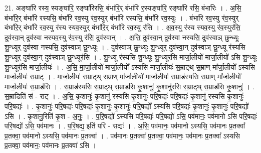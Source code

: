 \documentclass[17pt]{extarticle}
\begin{document}
21. अङ्घा॑रि रस्य॒ स्यङ्घा॑रि॒ रङ्घा॑रिरसि॒ बंभा॑रि॒र् बंभा॑रि र॒स्यङ्घा॑रि॒ रङ्घा॑रि रसि॒ बंभा॑रिः । . अ॒सि॒ बंभा॑रि॒र् बंभा॑रि रस्यसि॒ बंभा॑रि रव॒स्यु र॑व॒स्युर् बंभा॑रि रस्यसि॒ बंभा॑रि रव॒स्युः । . बंभा॑रि रव॒स्यु र॑व॒स्युर् बंभा॑रि॒र् बंभा॑रि रव॒स्यु र॑स्य स्यव॒स्युर् बंभा॑रि॒र् बंभा॑रि रव॒स्यु र॑सि । . अ॒व॒स्यु र॑स्य स्यव॒स्यु र॑व॒स्युर॑सि॒ दुव॑स्वा॒न् दुव॑स्वा नस्यव॒स्यु र॑व॒स्यु र॑सि॒ दुव॑स्वान् । . अ॒सि॒ दुव॑स्वा॒न् दुव॑स्वा नस्यसि॒ दुव॑स्वाञ् छु॒न्ध्यूः शु॒न्ध्यूर् दुव॑स्वा नस्यसि॒ दुव॑स्वाञ् छु॒न्ध्यूः । . दुव॑स्वाञ् छु॒न्ध्यूः शु॒न्ध्यूर् दुव॑स्वा॒न् दुव॑स्वाञ् छु॒न्ध्यू र॑स्यसि शु॒न्ध्यूर् दुव॑स्वा॒न् दुव॑स्वाञ् छु॒न्ध्यूर॑सि । . शु॒न्ध्यू र॑स्यसि शु॒न्ध्यूः शु॒न्ध्यूर॑सि मार्जा॒लीयो॑ मार्जा॒लीयो॑ ऽसि शु॒न्ध्यूः शु॒न्ध्यूर॑सि मार्जा॒लीयः॑ । . अ॒सि॒ मा॒र्जा॒लीयो॑ मार्जा॒लीयो᳚ ऽस्यसि मार्जा॒लीयः॑ स॒म्राट्थ् स॒म्राण् मा᳚र्जा॒लीयो᳚ ऽस्यसि मार्जा॒लीयः॑ स॒म्राट् । . मा॒र्जा॒लीयः॑ स॒म्राट्थ् स॒म्राण् मा᳚र्जा॒लीयो॑ मार्जा॒लीयः॑ स॒म्राड॑स्यसि स॒म्राण् मा᳚र्जा॒लीयो॑ मार्जा॒लीयः॑ स॒म्राड॑सि । . स॒म्राड॑स्यसि स॒म्राट्थ् स॒म्राड॑सि कृ॒शानुः॑ कृ॒शानु॑रसि स॒म्राट्थ् स॒म्राड॑सि कृ॒शानुः॑ । . स॒म्राडिति॑ सं - राट् । . अ॒सि॒ कृ॒शानुः॑ कृ॒शानु॑ रस्यसि कृ॒शानुः॑ परि॒षद्यः॑ परि॒षद्यः॑ कृ॒शानु॑ रस्यसि कृ॒शानुः॑ परि॒षद्यः॑ । . कृ॒शानुः॑ परि॒षद्यः॑ परि॒षद्यः॑ कृ॒शानुः॑ कृ॒शानुः॑ परि॒षद्यो᳚ ऽस्यसि परि॒षद्यः॑ कृ॒शानुः॑ कृ॒शानुः॑ परि॒षद्यो॑ ऽसि । . कृ॒शानु॒रिति॑ कृ॒श - अ॒नुः॒ । . प॒रि॒षद्यो᳚ ऽस्यसि परि॒षद्यः॑ परि॒षद्यो॑ ऽसि॒ पव॑मानः॒ पव॑मानो ऽसि परि॒षद्यः॑ परि॒षद्यो॑ ऽसि॒ पव॑मानः । . प॒रि॒षद्य॒ इति॑ परि - सद्यः॑ । . अ॒सि॒ पव॑मानः॒ पव॑मानो ऽस्यसि॒ पव॑मानः प्र॒तक्वा᳚ प्र॒तक्वा॒ पव॑मानो ऽस्यसि॒ पव॑मानः प्र॒तक्वा᳚ । . पव॑मानः प्र॒तक्वा᳚ प्र॒तक्वा॒ पव॑मानः॒ पव॑मानः प्र॒तक्वा᳚ ऽस्यसि प्र॒तक्वा॒ पव॑मानः॒ पव॑मानः प्र॒तक्वा॑ ऽसि । \newline
\end{document}
